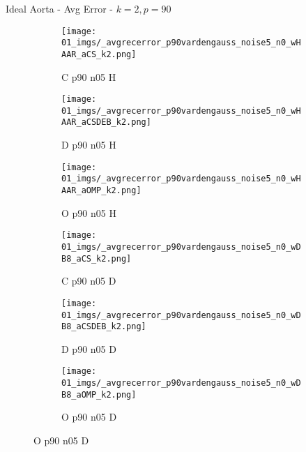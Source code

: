 \begin{frame}{Ideal Aorta - Avg Error - $k=2,p=90$}{}
\begin{figure}
\begin{subfigure}{0.13\textwidth}
\texttt{[image: 01\_imgs/\_avgrecerror\_p90vardengauss\_noise5\_n0\_wHAAR\_aCS\_k2.png]}
\caption*{\tiny C p90 n05 H}
\end{subfigure}
\begin{subfigure}{0.13\textwidth}
\texttt{[image: 01\_imgs/\_avgrecerror\_p90vardengauss\_noise5\_n0\_wHAAR\_aCSDEB\_k2.png]}
\caption*{\tiny D p90 n05 H}
\end{subfigure}
\begin{subfigure}{0.13\textwidth}
\texttt{[image: 01\_imgs/\_avgrecerror\_p90vardengauss\_noise5\_n0\_wHAAR\_aOMP\_k2.png]}
\caption*{\tiny O p90 n05 H}
\end{subfigure}
\begin{subfigure}{0.13\textwidth}
\texttt{[image: 01\_imgs/\_avgrecerror\_p90vardengauss\_noise5\_n0\_wDB8\_aCS\_k2.png]}
\caption*{\tiny C p90 n05 D}
\end{subfigure}
\begin{subfigure}{0.13\textwidth}
\texttt{[image: 01\_imgs/\_avgrecerror\_p90vardengauss\_noise5\_n0\_wDB8\_aCSDEB\_k2.png]}
\caption*{\tiny D p90 n05 D}
\end{subfigure}
\begin{subfigure}{0.13\textwidth}
\texttt{[image: 01\_imgs/\_avgrecerror\_p90vardengauss\_noise5\_n0\_wDB8\_aOMP\_k2.png]}
\caption*{\tiny O p90 n05 D}
\end{subfigure}

\vspace{5pt}


\end{figure}
\end{frame}
